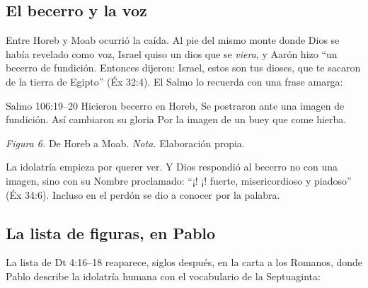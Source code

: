 \subsection{El becerro y la voz}

Entre Horeb y Moab ocurrió la caída. Al pie del mismo monte donde Dios se había revelado como voz, Israel quiso un dios que se \emph{viera}, y Aarón hizo ``un becerro de fundición. Entonces dijeron: Israel, estos son tus dioses, que te sacaron de la tierra de Egipto'' (Éx 32:4). El Salmo lo recuerda con una frase amarga:

\begin{verso}{Salmo 106:19–20}
Hicieron becerro en Horeb, Se postraron ante una imagen de fundición. Así cambiaron su gloria Por la imagen de un buey que come hierba.
\end{verso}

\begin{center}
\par
{\footnotesize\color{gris}\textit{Figura 6.} De Horeb a Moab. \textit{Nota.} Elaboración propia.}
\end{center}

La idolatría empieza por querer ver. Y Dios respondió al becerro no con una imagen, sino con su Nombre proclamado: ``¡\SENOR! ¡\SENOR! fuerte, misericordioso y piadoso'' (Éx 34:6). Incluso en el perdón se dio a conocer por la palabra.

\subsection{La lista de figuras, en Pablo}

La lista de Dt 4:16--18 reaparece, siglos después, en la carta a los Romanos, donde Pablo describe la idolatría humana con el vocabulario de la Septuaginta:

